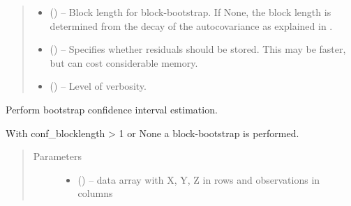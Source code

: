 \documentclass[letterpaper,10pt,english]{sphinxmanual}
\begin{document}
\begin{fulllineitems}
\begin{quote}
\begin{description}
\begin{itemize}
\item {} 
 (\sphinxstyleliteralemphasis{, }\sphinxstyleliteralemphasis{ (}\sphinxstyleliteralemphasis{)}\sphinxstyleliteralemphasis{}) -- Block length for block-bootstrap. If None, the block length is
determined from the decay of the autocovariance as explained in \sphinxfootnotemark[1].

\item {} 
 (\sphinxstyleliteralemphasis{, }\sphinxstyleliteralemphasis{ (}\sphinxstyleliteralemphasis{)}\sphinxstyleliteralemphasis{}) -- Specifies whether residuals should be stored. This may be faster, but
can cost considerable memory.

\item {} 
 (\sphinxstyleliteralemphasis{, }\sphinxstyleliteralemphasis{ (}\sphinxstyleliteralemphasis{)}\sphinxstyleliteralemphasis{}) -- Level of verbosity.

\end{itemize}

\end{description}\end{quote}

\begin{fulllineitems}
\label{\detokenize{index:tigramite.independence_tests.CondIndTest.get_bootstrap_confidence}}
Perform bootstrap confidence interval estimation.

With conf\_blocklength \textgreater{} 1 or None a block-bootstrap is performed.
\begin{quote}\begin{description}
\item[{Parameters}] \leavevmode\begin{itemize}
\item {} 
 () -- data array with X, Y, Z in rows and observations in columns


\end{itemize}
\end{description}
\end{quote}
\end{fulllineitems}
\end{fulllineitems}
\end{document}
